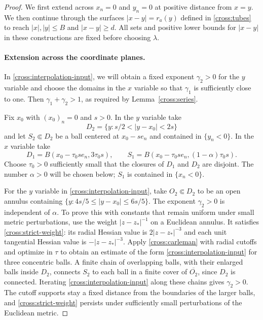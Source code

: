 \documentclass[11pt,a4paper]{article}
\theoremstyle{definition}
\theoremstyle{remark}
\numberwithin{equation}{section}
\begin{document}
\begin{proof}
We first extend across $x_n=0$ and $y_n=0$ at positive distance from
$x=y$.  We then continue through the surfaces
$|x-y|=r_a(y)$ defined in \eqref{cross:tubes} to reach
$|x|,|y|\le B$ and $|x-y|\ge d$.
All sets and positive lower bounds for $|x-y|$ in these constructions
are fixed before choosing $\lambda$.

\paragraph{Extension across the coordinate planes.}
In \eqref{cross:interpolation-input}, we will obtain a fixed exponent
$\gamma_2>0$ for the $y$ variable and choose the domains in the $x$
variable so that $\gamma_1$ is sufficiently close to one.
Then $\gamma_1+\gamma_2>1$, as required by
Lemma~\ref{cross:series}.

Fix $x_0$ with $(x_0)_n=0$ and $s>0$.
In the $y$ variable take
\[
 D_2=\{y:s/2<|y-x_0|<2s\}
\]
and let $S_2\Subset D_2$ be a ball centered at $x_0-se_n$ and
contained in $\{y_n<0\}$.
In the $x$ variable take
\[
 D_1=B(x_0-\tau_0se_n,3\tau_0s),\qquad
 S_1=B(x_0-\tau_0se_n,(1-\alpha)\tau_0s).
\]
Choose $\tau_0>0$ sufficiently small that the closures of $D_1$ and
$D_2$ are disjoint.  The number $\alpha>0$ will be chosen below;
$S_1$ is contained in $\{x_n<0\}$.

For the $y$ variable in \eqref{cross:interpolation-input}, take
$O_2\Subset D_2$ to be an open annulus containing
$\{y:4s/5\le|y-x_0|\le6s/5\}$. The exponent $\gamma_2>0$ is
independent of $\alpha$.
To prove this with constants that remain uniform under small metric
perturbations, use the weight $|z-z_*|^{-1}$ on a Euclidean annulus.
It satisfies \eqref{cross:strict-weight}: its radial Hessian value is
$2|z-z_*|^{-3}$ and each unit tangential Hessian value is
$-|z-z_*|^{-3}$.
Apply \eqref{cross:carleman} with radial cutoffs and optimize in $\tau$
to obtain an estimate of the form \eqref{cross:interpolation-input}
for three concentric balls.
A finite chain of overlapping balls, with their enlarged balls inside
$D_2$, connects $S_2$ to each ball in a finite cover of $\overline{O_2}$,
since $D_2$ is connected. Iterating \eqref{cross:interpolation-input}
along these chains gives $\gamma_2>0$. The cutoff supports stay a fixed
distance from the boundaries of the larger balls, and
\eqref{cross:strict-weight} persists under sufficiently small
perturbations of the Euclidean metric.


\end{proof}
\end{document}
